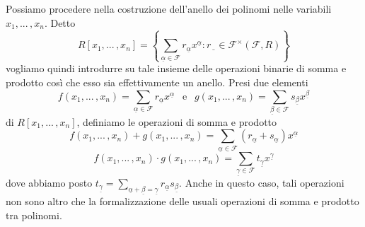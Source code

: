 \documentclass{article}
\theoremstyle{definition}
\newcommand{\valpha}{\underline{\alpha}}
\newcommand{\vbeta}{\underline{\beta}}
\newcommand{\vgamma}{\underline{\gamma}}
\newcommand{\rbar}{r\underline{\, \, \,}}
\begin{document}
\clearpage

\noindent Possiamo procedere nella costruzione dell'anello dei polinomi nelle variabili $x_1,...\,,x_n$. Detto $$R[x_1,...\,,x_n]=\left\{ \sum\limits_{\valpha\in \mathcal{F}} r_{\valpha} x^{\valpha} : \rbar \in \mathcal{F}^{\times}(\mathcal{F},R) \right\}$$ vogliamo quindi introdurre su tale insieme delle operazioni binarie di somma e prodotto così che esso sia effettivamente un anello. Presi due elementi $$f(x_1,...\,,x_n) = \sum\limits_{\valpha\in \mathcal{F}}r_{\valpha} x^{\valpha} \ \ \text{ e } \ \ g(x_1,...\,,x_n)=\sum\limits_{\vbeta\in \mathcal{F}}s_{\vbeta} x^{\vbeta}$$ di $R[x_1,...\,,x_n]$, definiamo le operazioni di somma e prodotto $$f(x_1,...\,,x_n)+g(x_1,...\,,x_n)=\sum\limits_{\valpha\in \mathcal{F}}(r_{\valpha}+s_{\valpha}) x^{\valpha}$$ $$f(x_1,...\,,x_n)\cdot g(x_1,...\,,x_n)=\sum\limits_{\vgamma \in \mathcal{F}}t_{\vgamma}x^{\vgamma}$$ dove abbiamo posto $t_{\vgamma}=\sum\limits_{\valpha+\vbeta=\vgamma} r_{\valpha}s_{\vbeta}$. Anche in questo caso, tali operazioni non sono altro che la formalizzazione delle usuali operazioni di somma e prodotto tra polinomi. 
\end{document}
